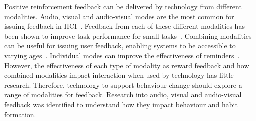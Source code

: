 \documentclass{scaffold/sigchi}
\begin{document}
Positive reinforcement feedback can be delivered by technology from different modalities. Audio, visual and audio-visual modes are the most common for issuing feedback in HCI~\cite{desinging_interface_speech_tech}. Feedback from each of these different modalities has been shown to improve task performance for small tasks~\cite{chi_oussama_tap_the_shapetones}. Combining modalities can be useful for issuing user feedback, enabling systems to be accessible to varying ages~\cite{article_user_centred_multimodal_reminders}. Individual modes can improve the effectiveness of reminders~\cite{multi_modal_reminders_less_disruptive, article_designing_multimodal_reminders_for_home}. However, the effectiveness of each type of modality as reward feedback and how combined modalities impact interaction when used by technology has little research. Therefore, technology to support behaviour change should explore a range of modalities for feedback. Research into audio, visual and audio-visual feedback was identified to understand how they impact behaviour and habit formation.
\end{document}

